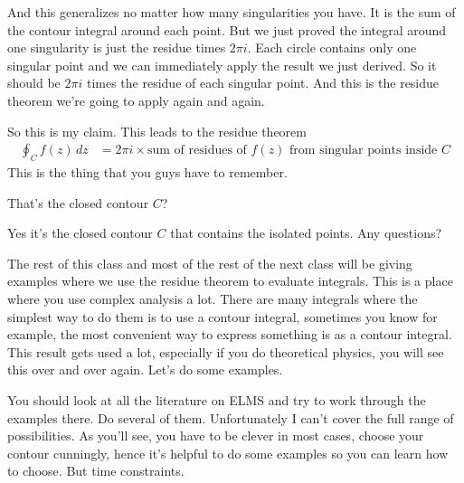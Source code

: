 And this generalizes no matter how many singularities you have.
It is the sum of the contour integral around each point.
But we just proved the integral around one singularity is just the residue times
$2\pi i$.
Each circle contains only one singular point
and we can immediately apply the result we just derived.
So it should be $2\pi i$ times the residue of each singular point.
And this is the residue theorem we're going to apply again and again.

So this is my claim.
This leads to the residue theorem
\begin{align}
    \oint_C f(z)\, dz &= 2\pi i\times
    \text{sum of residues of $f(z)$ from singular points inside $C$}
\end{align}
This is the thing that you guys have to remember.

\begin{question}
    That's the closed contour $C$?
\end{question}
Yes it's the closed contour $C$ that contains the isolated points.
Any questions?

The rest of this class and most of the rest of the next class will be giving
examples where we use the residue theorem to evaluate integrals.
This is a place where you use complex analysis a lot.
There are many integrals where the simplest way to do them is to use a contour
integral,
sometimes you know for example,
the most convenient way to express something is as a contour integral.
This result gets used a lot,
especially if you do theoretical physics,
you will see this over and over again.
Let's do some examples.

You should look at all the literature on ELMS
and try to work through the examples there.
Do several of them.
Unfortunately I can't cover the full range of possibilities.
As you'll see,
you have to be clever in most cases,
choose your contour cunningly,
hence it's helpful to do some examples so you can learn how to choose.
But time constraints.

